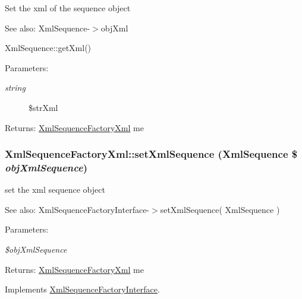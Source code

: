 Set the xml of the sequence object

\begin{Desc}
\item[See also:]XmlSequence-$>$objXml 

XmlSequence::getXml() \end{Desc}
\begin{Desc}
\item[Parameters:]
\begin{description}
\item[{\em string}]\$strXml \end{description}
\end{Desc}
\begin{Desc}
\item[Returns:]\hyperlink{class_xml_sequence_factory_xml}{XmlSequenceFactoryXml} me \end{Desc}
\hypertarget{class_xml_sequence_factory_xml_c1282bb7211c84aff732419317312152}{
\subsubsection[{setXmlSequence}]{\setlength{\rightskip}{0pt plus 5cm}XmlSequenceFactoryXml::setXmlSequence ({\bf XmlSequence} \$ {\em objXmlSequence})}}
\label{class_xml_sequence_factory_xml_c1282bb7211c84aff732419317312152}


set the xml sequence object

\begin{Desc}
\item[See also:]XmlSequenceFactoryInterface-$>$setXmlSequence( XmlSequence ) \end{Desc}
\begin{Desc}
\item[Parameters:]
\begin{description}
\item[{\em \$objXmlSequence}]\end{description}
\end{Desc}
\begin{Desc}
\item[Returns:]\hyperlink{class_xml_sequence_factory_xml}{XmlSequenceFactoryXml} me \end{Desc}


Implements \hyperlink{interface_xml_sequence_factory_interface_8fbb97bc3fbf487c357f5a255a3a2357}{XmlSequenceFactoryInterface}.


